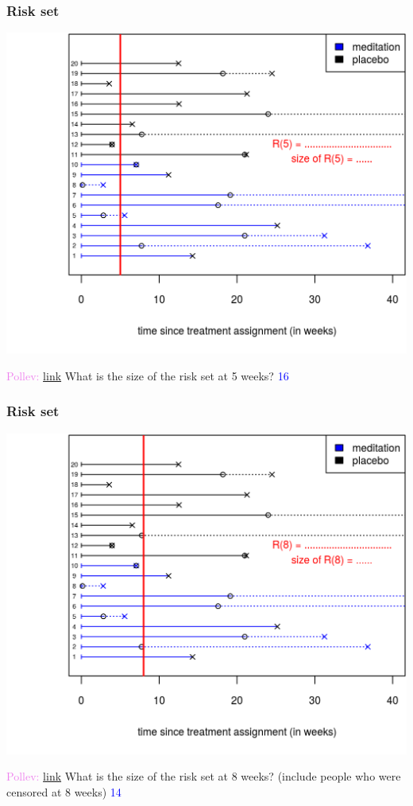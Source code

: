 \documentclass[10pt,t]{beamer}
\begin{document}
\begin{frame}
\frametitle{Risk set}
\begin{center}
\includegraphics[height=0.8\textheight]{figs/risk_set_movie_2.png}
\end{center}

\textcolor{violet}{Pollev: \href{https://PollEv.com/free_text_polls/7351VWJoQzih5iGOeImh2/respond}{link}} What is the size of the risk set at 5 weeks? \pause\textcolor{blue}{16}


\end{frame}

\begin{frame}
\frametitle{Risk set}
\begin{center}
\includegraphics[height=0.8\textheight]{figs/risk_set_movie_3.png}
\end{center}

\textcolor{violet}{Pollev: \href{https://PollEv.com/free_text_polls/5lZONvVj6OxOmvX0N1BHP/respond}{link}} What is the size of the risk set at 8 weeks? (include people who were censored at 8 weeks) \pause\textcolor{blue}{14}



\end{frame}
\end{document}
